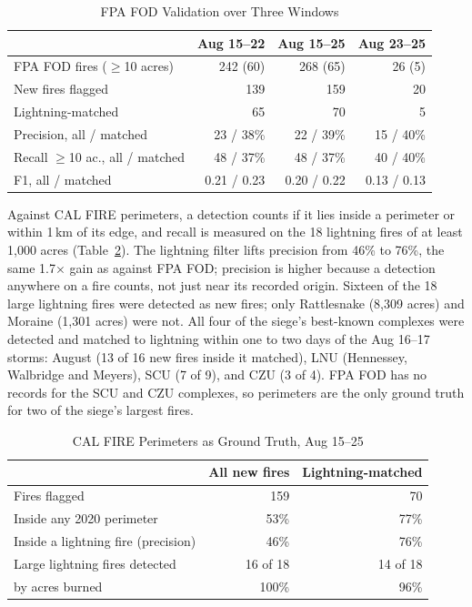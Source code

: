 \documentclass[10pt,journal,compsoc]{IEEEtran}
\begin{document}
\begin{table}[!t]
\caption{FPA FOD Validation over Three Windows}
\label{tab:broad}
\centering
\footnotesize
\setlength{\tabcolsep}{3pt}
\begin{tabular}{@{}lrrr@{}}
\toprule
 & Aug 15--22 & Aug 15--25 & Aug 23--25 \\
\midrule
FPA FOD fires ($\geq$10 acres) & 242 (60) & 268 (65) & 26 (5) \\
New fires flagged & 139 & 159 & 20 \\
Lightning-matched & 65 & 70 & 5 \\
Precision, all / matched & 23 / 38\% & 22 / 39\% & 15 / 40\% \\
Recall $\geq$10 ac., all / matched & 48 / 37\% & 48 / 37\% & 40 / 40\% \\
F1, all / matched & 0.21 / 0.23 & 0.20 / 0.22 & 0.13 / 0.13 \\
\bottomrule
\end{tabular}
\end{table}

Against CAL FIRE perimeters, a detection counts if it lies inside a perimeter or within 1\,km of its edge, and recall is measured on the 18 lightning fires of at least 1,000 acres (Table~\ref{tab:perim}). The lightning filter lifts precision from 46\% to 76\%, the same 1.7$\times$ gain as against FPA FOD; precision is higher because a detection anywhere on a fire counts, not just near its recorded origin. Sixteen of the 18 large lightning fires were detected as new fires; only Rattlesnake (8,309 acres) and Moraine (1,301 acres) were not. All four of the siege's best-known complexes were detected and matched to lightning within one to two days of the Aug 16--17 storms: August (13 of 16 new fires inside it matched), LNU (Hennessey, Walbridge and Meyers), SCU (7 of 9), and CZU (3 of 4). FPA FOD has no records for the SCU and CZU complexes, so perimeters are the only ground truth for two of the siege's largest fires.

\begin{table}[!t]
\caption{CAL FIRE Perimeters as Ground Truth, Aug 15--25}
\label{tab:perim}
\centering
\footnotesize
\setlength{\tabcolsep}{3pt}
\begin{tabular}{@{}lrr@{}}
\toprule
 & All new fires & Lightning-matched \\
\midrule
Fires flagged & 159 & 70 \\
Inside any 2020 perimeter & 53\% & 77\% \\
Inside a lightning fire (precision) & 46\% & 76\% \\
Large lightning fires detected & 16 of 18 & 14 of 18 \\
\quad by acres burned & 100\% & 96\% \\
\bottomrule
\end{tabular}
\end{table}
\end{document}

